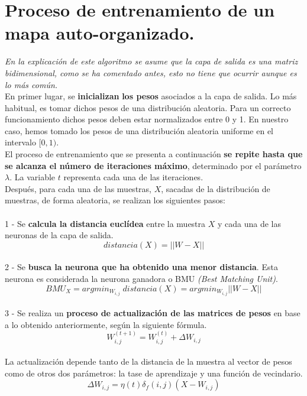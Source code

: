 \section{Proceso de entrenamiento de un mapa auto-organizado.}
\textit{En la explicación de este algoritmo se asume que la capa de salida es una matriz bidimensional, como se ha comentado antes, esto no tiene que ocurrir aunque es lo más común.}\\

En primer lugar, se \textbf{inicializan} \textbf{los pesos} asociados a la capa de salida. Lo más habitual, es tomar dichos pesos de una distribución aleatoria.
Para un correcto funcionamiento dichos pesos deben estar normalizados entre 0 y 1. En nuestro caso, hemos tomado los pesos de una distribución aleatoria uniforme en el intervalo $[0, 1)$.\\

El proceso de entrenamiento que se presenta a continuación \textbf{se repite hasta que se alcanza el número de iteraciones máximo}, determinado por el parámetro $\lambda$. La variable $t$ representa cada una de las iteraciones.\\

Después, para cada una de las muestras, $X$, sacadas de la distribución de muestras, de forma aleatoria, se realizan los siguientes pasos: \\\\
1 - Se \textbf{calcula la distancia euclídea} entre la muestra $X$ y cada una de las neuronas de la capa de salida.\\
$$distancia(X) = || W - X ||$$\\
2 - Se \textbf{busca la neurona que ha obtenido una menor distancia}. Esta neurona es considerada la neurona ganadora o BMU \textit{(Best Matching Unit)}.\\
$$BMU_X = argmin_{W_{i, j}} \; distancia(X) = argmin_{W_{i, j}} || W - X ||$$\\
3 - Se realiza un \textbf{proceso de actualización de las matrices de pesos} en base a lo obtenido anteriormente, según la siguiente fórmula.\\
$$ W_{i, j}^{(t+1)} = W_{i, j}^{(t)} + \Delta {W_{i,j}} $$\\

La actualización depende tanto de la distancia de la muestra al vector de pesos como de otros dos parámetros: la tase de aprendizaje y una función de vecindario.\\

$$\Delta W_{i,j} = \eta(t)\delta_f(i,j)(X-W_{i,j})$$\\

